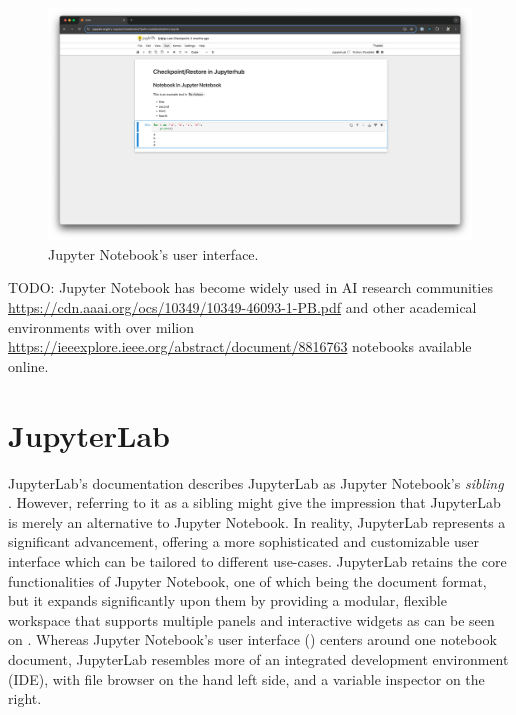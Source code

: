 \documentclass[
  digital,     %
  oneside,     %
  nosansbold,  %
  nocolorbold, %
  lof,         %
  lot,         %
]{fithesis4}
\begin{document}
\begin{figure}[H]
  \begin{center}
  \includegraphics[width=\textwidth]{figures/jupyter-notebook-screenshot.png}
  \end{center}
  \caption{Jupyter Notebook's user interface.}
  \label{fig:jupyter-notebook-screenshot}
\end{figure}


 TODO: Jupyter Notebook has become widely used in AI research communities \url{ https://cdn.aaai.org/ocs/10349/10349-46093-1-PB.pdf} and other academical environments with over milion \url{https://ieeexplore.ieee.org/abstract/document/8816763} notebooks available online.

\section{JupyterLab}
JupyterLab's documentation describes JupyterLab as Jupyter Notebook's \emph{sibling} \cite{jupyter_lab}. However, referring to it as a sibling might give the impression that JupyterLab is merely an alternative to Jupyter Notebook. In reality, JupyterLab represents a significant advancement, offering a more sophisticated and customizable user interface which can be tailored to different use-cases. JupyterLab retains the core functionalities of Jupyter Notebook, one of which being the document format, but it expands significantly upon them by providing a modular, flexible workspace that supports multiple panels and interactive widgets as can be seen on . Whereas Jupyter Notebook's user interface () centers around one notebook document, JupyterLab resembles more of an integrated development environment (IDE), with file browser on the hand left side, and a variable inspector on the right.
\end{document}
